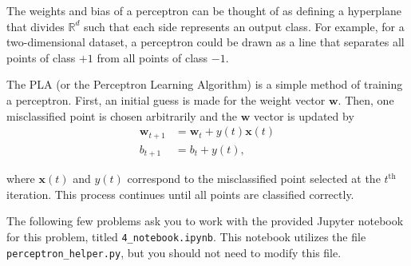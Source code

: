 The weights and bias of a perceptron can be thought of as defining a hyperplane that divides $\mathbb{R}^d$ such that each side represents an output class. For example, for a two-dimensional dataset, a perceptron could be drawn as a line that separates all points of class $+1$ from all points of class $-1$.

The PLA (or the Perceptron Learning Algorithm) is a simple method of training a perceptron. First, an initial guess is made for the weight vector $\mathbf{w}$. Then, one misclassified point is chosen arbitrarily and the $\mathbf{w}$ vector is updated by
\begin{align*}
  \mathbf{w}_{t+1} &= \mathbf{w}_t + y(t)\mathbf{x}(t) \\
  b_{t + 1} &= b_t + y(t),
\end{align*}

where $\mathbf{x}(t)$ and $y(t)$ correspond to the misclassified point selected at the $t^\text{th}$ iteration.
This process continues until all points are classified correctly.

The following few problems ask you to work with the provided Jupyter notebook for this problem, titled \texttt{4_notebook.ipynb}. This notebook utilizes the file \texttt{perceptron_helper.py}, but you should not need to modify this file.

